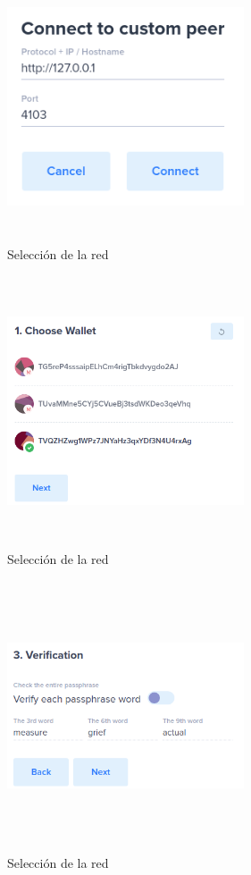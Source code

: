 \begin{figure}[h]
	\centering
	\includegraphics[width=7cm,height=8cm]{figuras/wallet_12.png}
	\caption{Selección de la red}
	\label{fig:wallet-12}
\end{figure}

\begin{figure}[h]
	\centering
	\includegraphics[width=7cm,height=8cm]{figuras/wallet_13.png}
	\caption{Selección de la red}
	\label{fig:wallet-13}
\end{figure}

\begin{figure}[h]
	\centering
	\includegraphics[width=7cm,height=8cm]{figuras/wallet_14.png}
	\caption{Selección de la red}
	\label{fig:wallet-14}
\end{figure}

